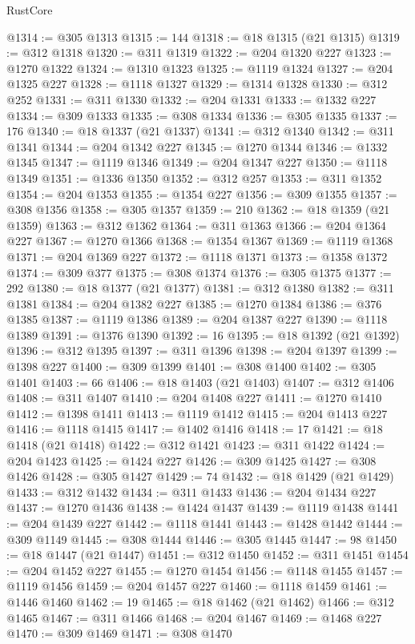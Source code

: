 \begin{lexlean}{RustCore}
\begin{coremodule}
@1314 := @305 @1313
@1315 := 144
@1318 := @18 @1315 (@21 @1315)
@1319 := @312 @1318
@1320 := @311 @1319
@1322 := @204 @1320 @227
@1323 := @1270 @1322
@1324 := @1310 @1323
@1325 := @1119 @1324
@1327 := @204 @1325 @227
@1328 := @1118 @1327
@1329 := @1314 @1328
@1330 := @312 @252
@1331 := @311 @1330
@1332 := @204 @1331
@1333 := @1332 @227
@1334 := @309 @1333
@1335 := @308 @1334
@1336 := @305 @1335
@1337 := 176
@1340 := @18 @1337 (@21 @1337)
@1341 := @312 @1340
@1342 := @311 @1341
@1344 := @204 @1342 @227
@1345 := @1270 @1344
@1346 := @1332 @1345
@1347 := @1119 @1346
@1349 := @204 @1347 @227
@1350 := @1118 @1349
@1351 := @1336 @1350
@1352 := @312 @257
@1353 := @311 @1352
@1354 := @204 @1353
@1355 := @1354 @227
@1356 := @309 @1355
@1357 := @308 @1356
@1358 := @305 @1357
@1359 := 210
@1362 := @18 @1359 (@21 @1359)
@1363 := @312 @1362
@1364 := @311 @1363
@1366 := @204 @1364 @227
@1367 := @1270 @1366
@1368 := @1354 @1367
@1369 := @1119 @1368
@1371 := @204 @1369 @227
@1372 := @1118 @1371
@1373 := @1358 @1372
@1374 := @309 @377
@1375 := @308 @1374
@1376 := @305 @1375
@1377 := 292
@1380 := @18 @1377 (@21 @1377)
@1381 := @312 @1380
@1382 := @311 @1381
@1384 := @204 @1382 @227
@1385 := @1270 @1384
@1386 := @376 @1385
@1387 := @1119 @1386
@1389 := @204 @1387 @227
@1390 := @1118 @1389
@1391 := @1376 @1390
@1392 := 16
@1395 := @18 @1392 (@21 @1392)
@1396 := @312 @1395
@1397 := @311 @1396
@1398 := @204 @1397
@1399 := @1398 @227
@1400 := @309 @1399
@1401 := @308 @1400
@1402 := @305 @1401
@1403 := 66
@1406 := @18 @1403 (@21 @1403)
@1407 := @312 @1406
@1408 := @311 @1407
@1410 := @204 @1408 @227
@1411 := @1270 @1410
@1412 := @1398 @1411
@1413 := @1119 @1412
@1415 := @204 @1413 @227
@1416 := @1118 @1415
@1417 := @1402 @1416
@1418 := 17
@1421 := @18 @1418 (@21 @1418)
@1422 := @312 @1421
@1423 := @311 @1422
@1424 := @204 @1423
@1425 := @1424 @227
@1426 := @309 @1425
@1427 := @308 @1426
@1428 := @305 @1427
@1429 := 74
@1432 := @18 @1429 (@21 @1429)
@1433 := @312 @1432
@1434 := @311 @1433
@1436 := @204 @1434 @227
@1437 := @1270 @1436
@1438 := @1424 @1437
@1439 := @1119 @1438
@1441 := @204 @1439 @227
@1442 := @1118 @1441
@1443 := @1428 @1442
@1444 := @309 @1149
@1445 := @308 @1444
@1446 := @305 @1445
@1447 := 98
@1450 := @18 @1447 (@21 @1447)
@1451 := @312 @1450
@1452 := @311 @1451
@1454 := @204 @1452 @227
@1455 := @1270 @1454
@1456 := @1148 @1455
@1457 := @1119 @1456
@1459 := @204 @1457 @227
@1460 := @1118 @1459
@1461 := @1446 @1460
@1462 := 19
@1465 := @18 @1462 (@21 @1462)
@1466 := @312 @1465
@1467 := @311 @1466
@1468 := @204 @1467
@1469 := @1468 @227
@1470 := @309 @1469
@1471 := @308 @1470

\end{coremodule}
\end{lexlean}

